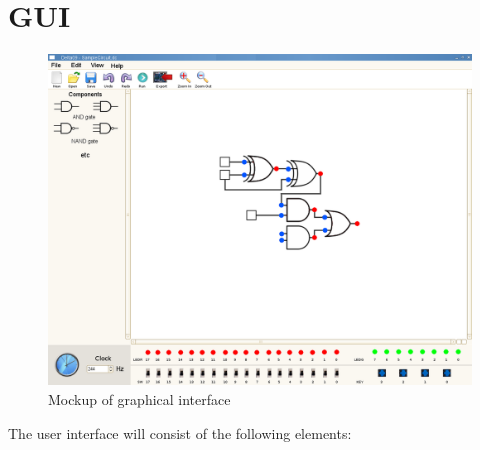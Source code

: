 \documentclass[12pt, a4paper, oneside,titlepage]{article}
\begin{document}
\section{GUI}
\begin{figure}[h]
\centering
\includegraphics[width=12cm]{GUI_mockup.png}
\caption{Mockup of graphical interface}\label{fig:erptsqfit}
\end{figure}
The user interface will consist of the following elements:
\end{document}
